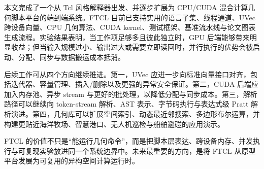 \documentclass{styles/jouthesis}
\begin{document}
\tableofcontents
\JOUListOfTablesAndFigures

\mainmatter







\backmatter
{}
本文完成了一个从 Tcl 风格解释器出发、并逐步扩展为 CPU/CUDA 混合计算几何脚本平台的端到端系统。FTCL 目前已支持实用的语言子集、线程通道、UVec 跨设备向量、CPU 几何算法、CUDA kernel、测试框架、基准流水线与论文图表生成流程。实验结果表明，当工作项足够多且彼此独立时，GPU 后端能够带来明显收益；但当输入规模过小、输出过大或需要立即读回时，并行执行的优势会被启动、分配、同步与数据搬运成本抵消。

后续工作可从四个方向继续推进。第一，UVec 应进一步向标准向量接口对齐，包括迭代器、容量管理、插入/删除以及更强的异常安全保证。第二，CUDA 后端应加入内存池、异步 stream 与更好的批处理，以降低分配与同步成本。第三，解析路径可以继续向 token-stream 解析、AST 表示、字节码执行与表达式级 Pratt 解析演进。第四，几何库可以扩展空间索引、动态最近邻搜索、多边形布尔运算，并构建更贴近海洋牧场、智慧港口、无人机巡检与船舶避碰的应用演示。

FTCL 的价值不只是“能运行几何命令”，而是把脚本层表达、跨设备内存、并发执行与可复现实验放进同一个系统边界中。未来最重要的方向，是将 FTCL 从原型平台发展为可复用的异构空间计算运行时。

\JOUAcknowledgementChapter


\nocite{*}
\JOUPrintBibliography

\appendix

\end{document}
